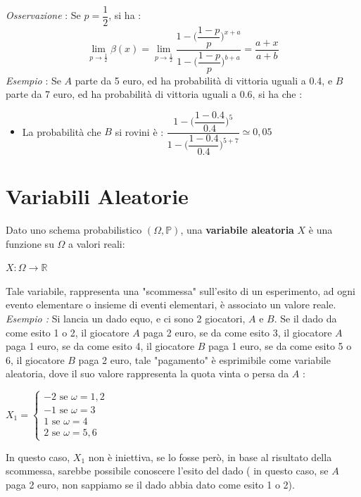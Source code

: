 \documentclass[12pt, letterpaper]{article}
\begin{document}
\\\textit{Osservazione }: Se \(p=\dfrac{1}{2}\), si ha :
\begin{equation}
    \lim_{p\rightarrow \frac{1}{2}}\beta(x)=\lim_{p\rightarrow \frac{1}{2}}\dfrac{1-\Big(\dfrac{1-p}{p}\Big)^{x+a}}{1-\Big(\dfrac{1-p}{p}\Big)^{b+a}}=\dfrac{a+x}{a+b}
\end{equation}
\textit{Esempio }: Se \(A\) parte da 5 euro, ed ha probabilità di vittoria uguali a 0.4, e 
\(B\) parte da 7 euro, ed ha probabilità di vittoria uguali a 0.6, si ha che :\begin{itemize}
    \item La probabilità che \(B\) si rovini è : \(\dfrac{1-\Big(\dfrac{1-0.4}{0.4}\Big)^{5}}{1-\Big(\dfrac{1-0.4}{0.4}\Big)^{5+7}}\simeq  0,05\)
\end{itemize}\newpage
\section{Variabili Aleatorie}
Dato uno schema probabilistico \((\Omega,\mathbb{P})\), una \textbf{variabile aleatoria} \(X\) è una 
funzione su \(\Omega\) a valori reali:\begin{center}
    \(X:\Omega\rightarrow\mathbb{R}\)
\end{center}
Tale variabile, rappresenta una "scommessa" sull'esito di un esperimento, ad ogni evento elementare o insieme 
di eventi elementari, è associato un valore reale.\\\textit{Esempio :} Si lancia un dado equo, e ci sono 2 
giocatori, \(A\) e \(B\). Se il dado da come esito 1 o 2, il giocatore \(A\) paga 2 euro, se da come 
esito 3, il giocatore \(A\) paga 1 euro, se da come esito 4, il giocatore \(B\) paga 1 euro, se da come 
esito 5 o 6, il giocatore \(B\) paga 2 euro, tale "pagamento" è esprimibile come variabile aleatoria, dove il suo 
valore rappresenta la quota vinta o persa da \(A\) :\begin{center}
    \(X_1=
    \begin{cases}
        -2\text{ se }\omega=1,2\\
        -1\text{ se  }\omega=3\\
        1\text{  se }\omega=4\\
        2\text{ se  }\omega=5,6
    \end{cases}    
    \)
\end{center}
In questo caso, \(X_1\) non è iniettiva, se lo fosse però, in base al risultato della scommessa, sarebbe possibile 
conoscere l'esito del dado ( in questo caso, se \(A\) paga 2 euro, non sappiamo se il dado abbia dato come esito 1 o 2).
\end{document}
